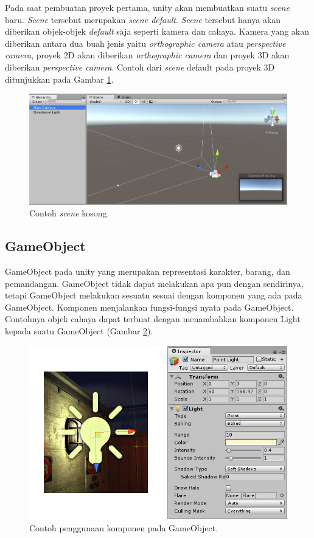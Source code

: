 Pada saat pembuatan proyek pertama, unity akan membuatkan suatu \textit{scene} baru. \textit{Scene} tersebut merupakan \textit{scene default}. \textit{Scene} tersebut hanya akan diberikan objek-objek \textit{default} saja seperti kamera dan cahaya. Kamera yang akan diberikan antara dua buah jenis yaitu \textit{orthographic camera} atau \textit{perspective camera}, proyek 2D akan diberikan \textit{orthographic camera} dan proyek 3D akan diberikan \textit{perspective camera}. Contoh dari \textit{scene} default pada proyek 3D ditunjukkan pada Gambar \ref{fig:contoh-scene-kosong}.
 
\begin{figure}[htbp]
\centering
\includegraphics[scale=0.5]{Gambar/new-empty-scene.png}
\caption{Contoh \textit{scene} kosong.} 
\label{fig:contoh-scene-kosong}
\end{figure}


\subsection{GameObject}
\label{ssec:gameobject}
GameObject pada unity yang merupakan representasi karakter, barang, dan pemandangan. GameObject tidak dapat melakukan apa pun dengan sendirinya, tetapi GameObject melakukan sesuatu sesuai dengan komponen yang ada pada GameObject. Komponen menjalankan fungsi-fungsi nyata pada GameObject. Contohnya objek cahaya dapat terbuat dengan menambahkan komponen Light kepada suatu GameObject (Gambar \ref{fig:contoh-component-pada-game-object}).

\begin{figure}[htbp]
\centering
\includegraphics[scale=0.7]{Gambar/contoh-component-pada-game-object.png}
\caption{Contoh penggunaan komponen pada GameObject.} 
\label{fig:contoh-component-pada-game-object}
\end{figure}
 
